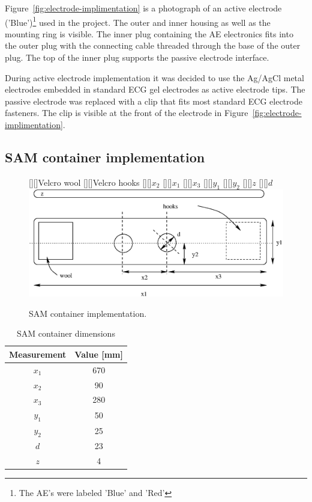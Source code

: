 Figure~\ref{fig:electrode-implimentation} is a photograph of an active
electrode ('Blue')\footnote{The AE's were labeled 'Blue' and 'Red'}
used in the project. The outer and inner housing as well as the
mounting ring is visible. The inner plug containing the AE electronics
fits into the outer plug with the connecting cable threaded through
the base of the outer plug. The top of the inner plug supports the
passive electrode interface.

During active electrode implementation it was decided to use the
Ag/AgCl metal electrodes embedded in standard ECG gel electrodes as
active electrode tips. The passive electrode was replaced with a clip
that fits most standard ECG electrode fasteners. The clip is visible
at the front of the electrode in
Figure~\ref{fig:electrode-implimentation}.


\subsection{SAM container implementation}
\begin{figure}[htbp]
	\begin{center}
	[][]{Velcro wool}
	[][]{Velcro hooks}
	[][]{$x_2$}
	[][]{$x_1$}		
	[][]{$x_3$}		
	[][]{$y_1$}
	[][]{$y_2$}
	[][]{$z$}
	[][]{$d$}
	\includegraphics[width=\textwidth]{headband2.eps}
	\caption{SAM container implementation.}
	\label{fig:container}
	\end{center}
\end{figure}

\begin{table}
\begin{center}	
	\begin{tabular}[htpb]{|c|c|} \hline
	Measurement & Value [mm]\\ \hline
	$x_1$ & 670 \\ 
	$x_2$ & 90 \\
	$x_3$ & 280 \\
	$y_1$ & 50 \\ 
	$y_2$ & 25 \\ 
	$d$ & 23 \\ 
	$z$ & 4 \\
	\hline
	\end{tabular}
	\caption{SAM container dimensions}
	\label{table:sam-container}
\end{center}	
\end{table}


